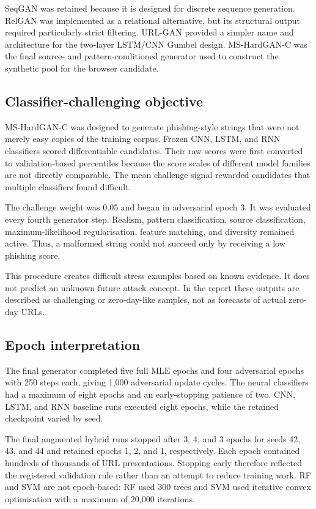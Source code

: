 SeqGAN was retained because it is designed for discrete sequence generation.
RelGAN was implemented as a relational alternative, but its structural output
required particularly strict filtering. URL-GAN provided a simpler name and
architecture for the two-layer LSTM/CNN Gumbel design. MS-HardGAN-C was the
final source- and pattern-conditioned generator used to construct the
synthetic pool for the browser candidate.

\subsection{Classifier-challenging objective}

MS-HardGAN-C was designed to generate phishing-style strings that were not
merely easy copies of the training corpus. Frozen CNN, LSTM, and RNN
classifiers scored differentiable candidates. Their raw scores were first
converted to validation-based percentiles because the score scales of different
model families are not directly comparable. The mean challenge signal rewarded
candidates that multiple classifiers found difficult.

The challenge weight was 0.05 and began in adversarial epoch 3. It was evaluated
every fourth generator step. Realism, pattern classification, source
classification, maximum-likelihood regularisation, feature matching, and
diversity remained active. Thus, a malformed string could not succeed only by
receiving a low phishing score.

This procedure creates difficult stress examples based on known evidence. It
does not predict an unknown future attack concept. In the report these outputs
are described as challenging or zero-day-like samples, not as forecasts of
actual zero-day URLs.

\subsection{Epoch interpretation}

The final generator completed five full MLE epochs and four adversarial epochs
with 250 steps each, giving 1,000 adversarial update cycles. The neural
classifiers had a maximum of eight epochs and an early-stopping patience of two.
CNN, LSTM, and RNN baseline runs executed eight epochs, while the retained
checkpoint varied by seed.

The final augmented hybrid runs stopped after 3, 4, and 3 epochs for seeds 42,
43, and 44 and retained epochs 1, 2, and 1, respectively. Each epoch contained
hundreds of thousands of URL presentations. Stopping early therefore reflected
the registered validation rule rather than an attempt to reduce training work.
RF and SVM are not epoch-based: RF used 300 trees and SVM used iterative convex
optimisation with a maximum of 20,000 iterations.


